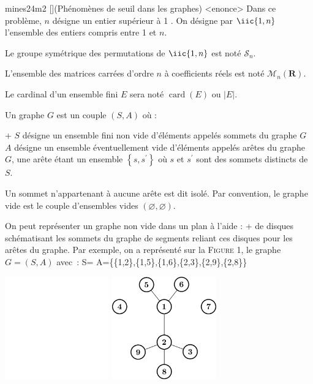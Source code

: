 \documentclass[11pt,solution]{cpgedev}
\let\i\isymb
\begin{document}
\titre
\begin{enonce}{mines24m2}
    [](Phénomènes de seuil dans les graphes)
    <enonce>
    \everymath{\displaystyle}
    Dans ce problème, $n$ désigne un entier supérieur à 1 .
    On désigne par $\iic{1,n}$ l'ensemble des entiers compris entre 1 et $n$. 
    
    Le groupe symétrique des permutations de $\iic{ 1, n }$ est noté $\mathcal{S}_n$. 
    
    L'ensemble des matrices carrées d'ordre $n$ à coefficients réels est noté $\mathcal{M}_n(\mathbf{R})$. 


    Le cardinal d'un ensemble fini $E$ sera noté $\operatorname{card}(E)$ ou $|E|$. 

    Un graphe $G$ est un couple $(S, A)$ où :

    \xit\i+
        $S$ désigne un ensemble fini non vide d'éléments appelés sommets du graphe $G$ 
    \xit
        $A$ désigne un ensemble éventuellement vide d'éléments appelés arêtes du graphe $G$, une arête étant un ensemble $\left\{s, s^{\prime}\right\}$ où $s$ et $s^{\prime}$ sont des sommets distincts de $S$.
    \exit

    Un sommet n'appartenant à aucune arête est dit isolé.
    Par convention, le graphe vide est le couple d'ensembles vides $(\varnothing, \varnothing)$.

    On peut représenter un graphe non vide dans un plan à l'aide :
    \xit\i+ 
        de disques schématisant les sommets du graphe
    \xit
        de segments reliant ces disques pour les arêtes du graphe.
    \exit 
    Par exemple, on a représenté sur la \textsc{Figure 1}, le graphe $G=(S, A)$ avec~:
    \<
        S=  
        A=\delim{}\{\{1,2\},\{1,5\},\{1,6\},\{2,3\},\{2,9\},\{2,8\}\}
    \>
    \begin{center}
        \ifdark 
            \includegraphics[width=4.5cm]{graphs/graph-dark-0}
        \else 
            \includegraphics[width=4.5cm]{graphs/graph-0}
        \fi 
    \end{center}




\end{enonce}
\end{document}
